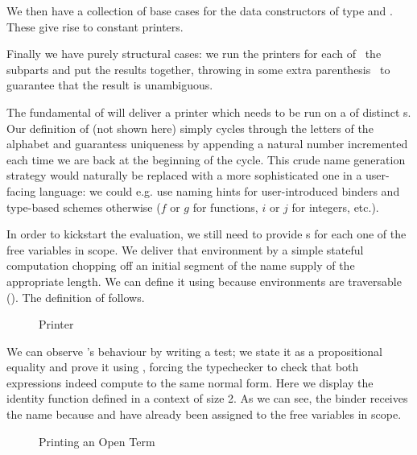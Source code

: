 
We then have a collection of base cases for the data constructors of type
 and . These give rise to constant printers.


Finally we have purely structural cases: we run the printers for each of~
the subparts and put the results together, throwing in some extra parenthesis~
to guarantee that the result is unambiguous.



The fundamental  of  will deliver a printer which needs to be run
on a  of distinct s. Our definition of  (not
shown here) simply cycles through the letters of the alphabet and guarantess
uniqueness by appending a natural number incremented each time we are back at
the beginning of the cycle. This crude name generation strategy would naturally
be replaced with a more sophisticated one in a user-facing language: we could
e.g. use naming hints for user-introduced binders and type-based schemes otherwise
($f$ or $g$ for functions, $i$ or $j$ for integers, etc.).

In order to kickstart the evaluation, we still need to provide s
for each one of the free variables in scope. We deliver that environment
by a simple stateful computation  chopping off an initial segment
of the name supply of the appropriate length. We can define it using 
because environments are traversable (\cite{mcbride_paterson_2008}).
The definition of  follows.

\begin{figure}[h]
\begin{minipage}{0.5\textwidth}
\end{minipage}\begin{minipage}{0.5\textwidth}
\end{minipage}

\caption{Printer\label{fig:printer}}
\end{figure}

We can observe 's behaviour by writing a test; we state it as a
propositional equality and prove it using , forcing the typechecker
to check that both expressions indeed compute to the same normal form. Here
we display the identity function defined in a context of size 2. As we can see,
the binder receives the name  because  and  have
already been assigned to the free variables in scope.

\begin{figure}[h]
\caption{Printing an Open Term\label{fig:printtest}}
\end{figure}

